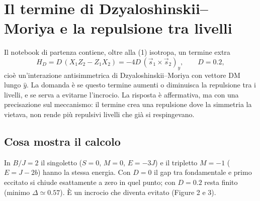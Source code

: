 \documentclass[11pt,a4paper]{article}
\begin{document}
\begin{center}
\end{center}

\section{Il termine di Dzyaloshinskii--Moriya e la repulsione tra livelli}

Il notebook di partenza contiene, oltre alla (1) isotropa, un termine extra
\begin{equation}
H_D = D\,(X_1Z_2 - Z_1X_2) = -4D\,(\vec s_1\times\vec s_2)_y, \qquad D=0.2,
\end{equation}
cio\`e un'interazione antisimmetrica di Dzyaloshinskii--Moriya con vettore DM lungo
$\hat y$. La domanda \`e se questo termine aumenti o diminuisca la repulsione tra i
livelli, e se serva a evitarne l'incrocio. La risposta \`e affermativa, ma con una
precisazione sul meccanismo: il termine crea una repulsione dove la simmetria la
vietava, non rende pi\`u repulsivi livelli che gi\`a si respingevano.

\subsection{Cosa mostra il calcolo}

In $B/J=2$ il singoletto ($S=0$, $M=0$, $E=-3J$) e il tripletto $M=-1$
($E=J-2b$) hanno la stessa energia. Con $D=0$ il gap tra fondamentale e primo
eccitato si chiude esattamente a zero in quel punto; con $D=0.2$ resta finito
(minimo $\Delta\simeq0.57$). \`E un incrocio che diventa evitato (Figure 2 e 3).
\end{document}
